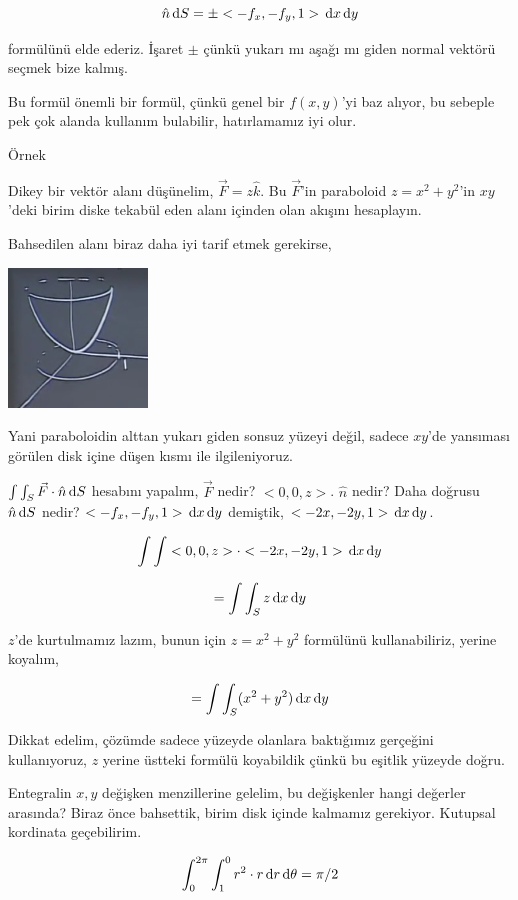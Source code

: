 \documentclass[12pt,fleqn]{article}\usepackage{../../common}
\begin{document}
$$
\hat{n} \,\mathrm{d} S = \pm < -f_x, -f_y, 1 > \,\mathrm{d} x \,\mathrm{d} y
$$

formülünü elde ederiz. İşaret $\pm$ çünkü yukarı mı aşağı mı giden normal
vektörü seçmek bize kalmış.

Bu formül önemli bir formül, çünkü genel bir $f(x,y)$'yi baz alıyor, bu
sebeple pek çok alanda kullanım bulabilir, hatırlamamız iyi olur.

Örnek

Dikey bir vektör alanı düşünelim, $\vec{F} = z \hat{k}$. Bu $\vec{F}$'in
paraboloid $z = x^2 + y^2$'in $xy$'deki birim diske tekabül eden alanı
içinden olan akışını hesaplayın.

Bahsedilen alanı biraz daha iyi tarif etmek gerekirse,

\includegraphics[width=10em]{calc_multi_28_04.png}

Yani paraboloidin alttan yukarı giden sonsuz yüzeyi değil, sadece $xy$'de
yansıması görülen disk içine düşen kısmı ile ilgileniyoruz. 

$\int \int_S \vec{F} \cdot \hat{n} \,\mathrm{d} S$ hesabını yapalım, $\vec{F}$ nedir?
$< 0, 0, z >$. $\hat{n}$ nedir? Daha doğrusu $\hat{n} \,\mathrm{d} S$ nedir?
$< -f_x, -f_y, 1 > \,\mathrm{d} x \,\mathrm{d} y$ demiştik, $< -2x, -2y, 1 > \,\mathrm{d} x \,\mathrm{d} y$.

$$
\int \int < 0, 0, z > \cdot < -2x, -2y, 1 > \,\mathrm{d} x \,\mathrm{d} y
$$

$$
= \int \int_S z \,\mathrm{d} x \,\mathrm{d} y
$$

$z$'de kurtulmamız lazım, bunun için $z = x^2 + y^2$ formülünü kullanabiliriz,
yerine koyalım,

$$
= \int \int_S (x^2 + y^2) \,\mathrm{d} x \,\mathrm{d} y
$$

Dikkat edelim, çözümde sadece yüzeyde olanlara baktığımız gerçeğini
kullanıyoruz, $z$ yerine üstteki formülü koyabildik çünkü bu eşitlik yüzeyde
doğru.

Entegralin $x,y$ değişken menzillerine gelelim, bu değişkenler hangi değerler
arasında? Biraz önce bahsettik, birim disk içinde kalmamız gerekiyor.
Kutupsal kordinata geçebilirim.

$$
\int_{0}^{2\pi} \int_{1}^{0} r^2 \cdot r \,\mathrm{d} r \,\mathrm{d} \theta = \pi / 2
$$
\end{document}
